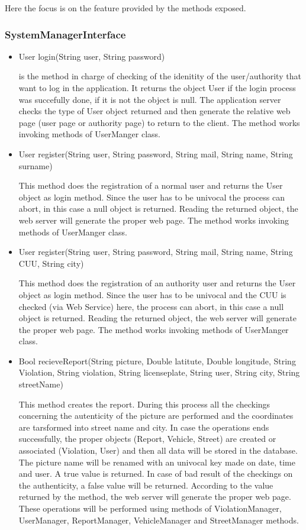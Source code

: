 Here the focus is on the feature provided by the methods exposed.

\subsubsection{SystemManagerInterface}

\begin{itemize}
	\item 
	User login(String user, String password)
	
	is the method in charge of checking of the idenitity of the user/authority that want to log in the application. It returns the object User if the login process was succefully done, if it is not the object is null. The application server checks the type of User object returned and then generate the relative web page (user page or authority page) to return to the client.
	The method works invoking methods of UserManger class.
	
	\item 
	User register(String user, String password, String mail, String name, String surname)
	
	This method does the registration of a normal user and returns the User object as login method. Since the user has to be univocal the process can abort, in this case a null object is returned.
	Reading the returned object, the web server will generate the proper web page.
	The method works invoking methods of UserManger class.
	
	\item 
	User register(String user, String password, String mail, String name, String CUU, String city)
	
	This method does the registration of an authority user and returns the User object as login method. Since the user has to be univocal and the CUU is checked (via Web Service) here, the process can abort, in this case a null object is returned.
	Reading the returned object, the web server will generate the proper web page.
	The method works invoking methods of UserManger class.
	
	\item
	 Bool recieveReport(String picture, Double latitute, Double longitude, String Violation, String violation, String licenseplate, String user, String city, String streetName)
	 
	 This method creates the report. During this process all the checkings concerning the autenticity of the picture are performed and the coordinates are tarsformed into street name and city. In case the operations ends successfully, the proper objects (Report, Vehicle, Street) are created or associated (Violation, User) and then all data will be stored in the database. The picture name will be renamed with an univocal key made on date, time and user. A true value is returned.
	 In case of bad result of the checkings on the authenticity, a false value will be returned.
	 According to the value returned by the method, the web server will generate the proper web page.
	 These operations will be performed using methods of ViolationManager, UserManager, ReportManager, VehicleManager and  StreetManager methods.
	 

\end{itemize}
